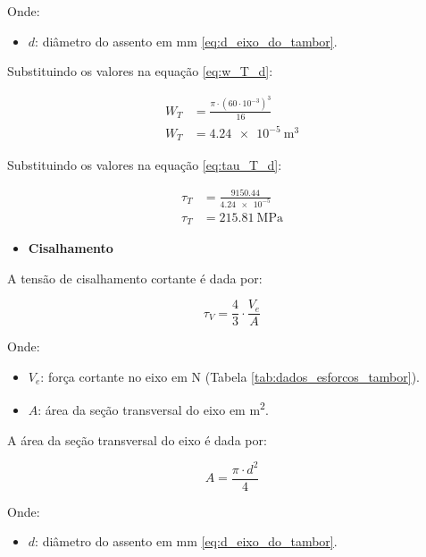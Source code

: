 Onde:

\begin{itemize}
  \item $d$: diâmetro do assento em \si{\milli\meter} \eqref{eq:d_eixo_do_tambor}.
\end{itemize}

\vspace{1em}

Substituindo os valores na equação \eqref{eq:w_T_d}:

\begin{align*}
  W_T & = \frac{\pi \cdot {\left( 60 \cdot 10^{-3} \right)}^3}{16} \\
  W_T & = \boxed{\SI{4.24e-5}{\meter^3}}
\end{align*}

Substituindo os valores na equação \eqref{eq:tau_T_d}:

\begin{align*}
  \tau_T & = \frac{\num{9150.44}}{\num{4.24e-5}} \\
  \tau_T & = \boxed{\SI{215.81}{\mega\pascal}}
\end{align*}

\begin{itemize}
  \item \textbf{Cisalhamento}
\end{itemize}

A tensão de cisalhamento cortante é dada por:

\begin{equation}
  \tau_V = \frac{4}{3} \cdot \frac{V_e}{A}
  \label{eq:tau_V_d}
\end{equation}

Onde:

\begin{itemize}
  \item $V_e$: força cortante no eixo em \si{\newton} (Tabela \ref{tab:dados_esforcos_tambor}).
  \item $A$: área da seção transversal do eixo em \si{\meter^2}.
\end{itemize}

\vspace{1em}

A área da seção transversal do eixo é dada por:

\begin{equation}
  A = \frac{\pi \cdot {d}^2}{4}
  \label{eq:a_d}
\end{equation}

Onde:

\begin{itemize}
  \item $d$: diâmetro do assento em \si{\milli\meter} \eqref{eq:d_eixo_do_tambor}.
\end{itemize}


